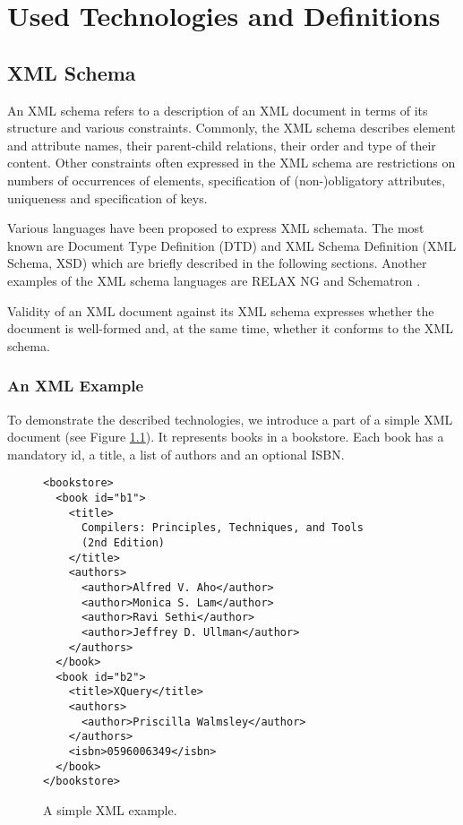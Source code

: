\chapter{Used Technologies and Definitions}

\section{XML Schema}
An XML schema refers to a description of an XML document in terms of its structure and various constraints. Commonly, the XML schema describes element and attribute names, their parent-child relations, their order and type of their content. Other constraints often expressed in the XML schema are restrictions on numbers of occurrences of elements, specification of (non-)obligatory attributes, uniqueness and specification of keys.

Various languages have been proposed to express XML schemata. The most known are Document Type Definition (DTD) \cite{Bray:08:EML} and XML Schema Definition (XML Schema, XSD) \cite{Walmsley:04:XSP, Thompson:04:XSP, Malhotra:04:XSP} which are briefly described in the following sections. Another examples of the XML schema languages are RELAX NG \cite{relaxng} and  Schematron \cite{schematron}.

Validity of an XML document against its XML schema expresses whether the document is well-formed \cite{Bray:08:EML} and, at the same time, whether it conforms to the XML schema.

\subsection{An XML Example}
To demonstrate the described technologies, we introduce a part of a simple XML document (see Figure \ref{FIG_a_simple_xml_example}). It represents books in a bookstore. Each book has a mandatory id, a title, a list of authors and an optional ISBN.

\begin{figure}
\begin{verbatim}
<bookstore>
  <book id="b1">
    <title>
      Compilers: Principles, Techniques, and Tools
      (2nd Edition)
    </title>
    <authors>
      <author>Alfred V. Aho</author>
      <author>Monica S. Lam</author>
      <author>Ravi Sethi</author>
      <author>Jeffrey D. Ullman</author>
    </authors>
  </book>
  <book id="b2">
    <title>XQuery</title>
    <authors>
      <author>Priscilla Walmsley</author>
    </authors>
    <isbn>0596006349</isbn>
  </book>
</bookstore>
\end{verbatim}
\caption{A simple XML example.}
\label{FIG_a_simple_xml_example}
\end{figure}

